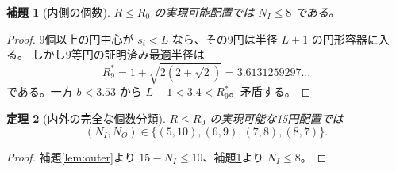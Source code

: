 \documentclass[11pt,a4paper]{article}
\theoremstyle{JPthm}
\newtheorem{theorem}{定理}[section]
\newtheorem{lemma}[theorem]{補題}
\theoremstyle{definition}
\newcommand{\Rc}{R_{0}}
\begin{document}
\begin{lemma}[内側の個数]\label{lem:inner}
$R\le\Rc$ の実現可能配置では $N_I\le8$ である。
\end{lemma}
\begin{proof}
9個以上の円中心が $s_i<L$ なら、その9円は半径 $L+1$ の円形容器に入る。
しかし9等円の証明済み最適半径は
\[
 R_9^*=1+\sqrt{2(2+\sqrt2)}=3.6131259297\ldots
\]
である\cite{pirl,packomania}。一方 $b<3.53$ から $L+1<3.4<R_9^*$。矛盾する。
\end{proof}

\begin{theorem}[内外の完全な個数分類]\label{thm:counts}
$R\le\Rc$ の実現可能な15円配置では
\[
 \boxed{(N_I,N_O)\in\{(5,10),(6,9),(7,8),(8,7)\}.}
\]
\end{theorem}
\begin{proof}
補題\ref{lem:outer}より $15-N_I\le10$、補題\ref{lem:inner}より $N_I\le8$。
\end{proof}
\end{document}

